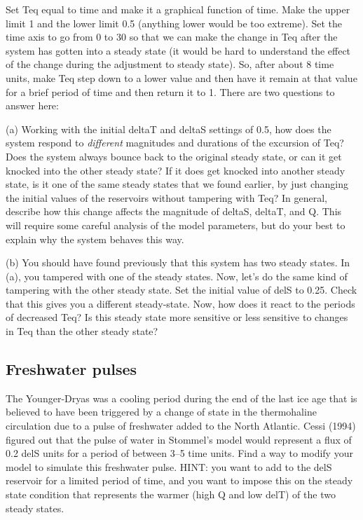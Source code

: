 \documentclass[11pt,letterpaper]{article}
\begin{document}
Set Teq equal to time and make it a graphical function of time. Make the upper limit 1 and the lower limit 0.5 (anything lower would be too extreme). Set the time axis to go from 0 to 30 so that we can make the change in Teq after the system has gotten into a steady state (it would be hard to understand the effect of the change during the adjustment to steady state). So, after about 8 time units, make Teq step down to a lower value and then have it remain at that value for a brief period of time and then return it to 1. There are two questions to answer here:

(a) Working with the initial deltaT and deltaS settings of 0.5, how does the system respond to \textit{different} magnitudes and durations of the excursion of Teq? Does the system always bounce back to the original steady state, or can it get knocked into the other steady state? If it does get knocked into another steady state, is it one of the same steady states that we found earlier, by just changing the initial values of the reservoirs without tampering with Teq? In general, describe how this change affects the magnitude of deltaS, deltaT, and Q. This will require some careful analysis of the model parameters, but do your best to explain why the system behaves this way.

(b) You should have found previously that this system has two steady states. In (a), you tampered with one of the steady states. Now, let’s do the same kind of tampering with the other steady state. Set the initial value of delS to 0.25. Check that this gives you a different steady-state. Now, how does it react to the periods of decreased Teq? Is this steady state more sensitive or less sensitive to changes in Teq than the other steady state?

\subsection{Freshwater pulses}
The Younger-Dryas was a cooling period during the end of the last ice age that is believed to have been triggered by a change of state in the thermohaline circulation due to a pulse of freshwater added to the North Atlantic. Cessi (1994) figured out that the pulse of water in Stommel's model would represent a flux of 0.2 delS units for a period of between 3--5 time units. Find a way to modify your model to simulate this freshwater pulse. HINT: you want to add to the delS reservoir for a limited period of time, and you want to impose this on the steady state condition that represents the warmer (high Q and low delT) of the two steady states.
\end{document}

